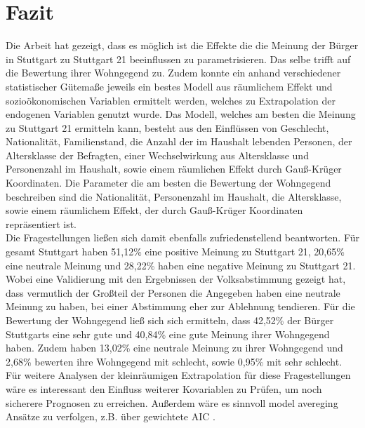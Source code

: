 \documentclass{Vorlage}
\begin{document}
\section{Fazit}
Die Arbeit hat gezeigt, dass es möglich ist die Effekte die die Meinung der Bürger in Stuttgart zu Stuttgart 21 beeinflussen zu parametrisieren. Das selbe trifft auf die Bewertung ihrer Wohngegend zu. Zudem konnte ein anhand verschiedener statistischer Gütemaße jeweils ein bestes Modell aus räumlichem Effekt und sozioökonomischen Variablen ermittelt werden, welches zu Extrapolation der endogenen Variablen genutzt wurde. Das Modell, welches am besten die Meinung zu Stuttgart 21 ermitteln kann, besteht aus den Einflüssen von Geschlecht, Nationalität, Familienstand, die Anzahl der im Haushalt lebenden Personen, der Altersklasse der Befragten, einer Wechselwirkung aus Altersklasse und  Personenzahl im Haushalt, sowie einem räumlichen Effekt durch Gauß-Krüger Koordinaten. Die Parameter die am besten die Bewertung der Wohngegend beschreiben sind die Nationalität, Personenzahl im Haushalt, die Altersklasse, sowie einem räumlichem Effekt, der durch Gauß-Krüger Koordinaten repräsentiert ist. \\
Die Fragestellungen ließen sich damit ebenfalls zufriedenstellend beantworten. Für gesamt Stuttgart haben 51,12\% eine positive Meinung zu Stuttgart 21, 20,65\% eine neutrale Meinung und 28,22\% haben eine negative Meinung zu Stuttgart 21. Wobei eine Validierung mit den Ergebnissen der Volksabstimmung gezeigt hat, dass vermutlich der Großteil der Personen die Angegeben haben eine neutrale Meinung zu haben, bei einer Abstimmung eher zur Ablehnung tendieren. Für die Bewertung der Wohngegend ließ sich sich ermitteln, dass 42,52\% der Bürger Stuttgarts eine sehr gute und 40,84\% eine gute Meinung ihrer Wohngegend haben. Zudem haben 13,02\% eine neutrale Meinung zu ihrer Wohngegend und 2,68\% bewerten ihre Wohngegend mit schlecht, sowie 0,95\% mit sehr schlecht.\\
Für weitere Analysen der kleinräumigen Extrapolation für diese Fragestellungen wäre es interessant den Einfluss weiterer Kovariablen zu Prüfen, um noch sicherere Prognosen zu erreichen. Außerdem wäre es sinnvoll model avereging Ansätze zu verfolgen, z.B. über gewichtete AIC \cite{WAIC}.


\clearpage



 
\end{document}
